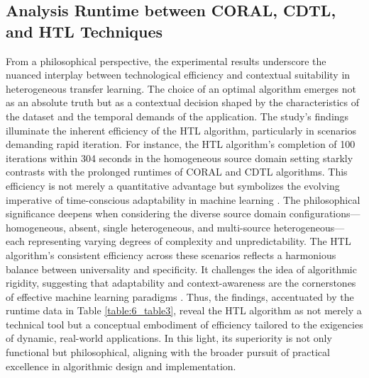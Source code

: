 \subsection{Analysis Runtime between CORAL, CDTL, and HTL Techniques}
From a philosophical perspective, the experimental results underscore the nuanced interplay between technological efficiency and contextual suitability in heterogeneous transfer learning. The choice of an optimal algorithm emerges not as an absolute truth but as a contextual decision shaped by the characteristics of the dataset and the temporal demands of the application. The study’s findings illuminate the inherent efficiency of the HTL algorithm, particularly in scenarios demanding rapid iteration. For instance, the HTL algorithm's completion of 100 iterations within 304 seconds in the homogeneous source domain setting starkly contrasts with the prolonged runtimes of CORAL and CDTL algorithms. This efficiency is not merely a quantitative advantage but symbolizes the evolving imperative of time-conscious adaptability in machine learning \cite{ref}. The philosophical significance deepens when considering the diverse source domain configurations—homogeneous, absent, single heterogeneous, and multi-source heterogeneous—each representing varying degrees of complexity and unpredictability. The HTL algorithm's consistent efficiency across these scenarios reflects a harmonious balance between universality and specificity. It challenges the idea of algorithmic rigidity, suggesting that adaptability and context-awareness are the cornerstones of effective machine learning paradigms \cite{ref}. Thus, the findings, accentuated by the runtime data in Table \ref{table:6_table3}, reveal the HTL algorithm as not merely a technical tool but a conceptual embodiment of efficiency tailored to the exigencies of dynamic, real-world applications. In this light, its superiority is not only functional but philosophical, aligning with the broader pursuit of practical excellence in algorithmic design and implementation.
